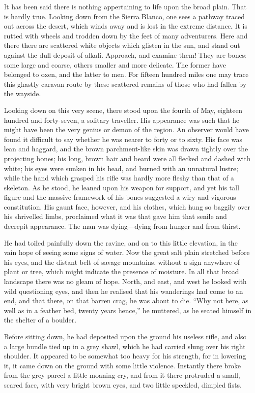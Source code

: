 \documentclass[12pt]{book}
\begin{document}
It has been said there is nothing appertaining to life upon the broad plain. That is hardly true. Looking down from the Sierra Blanco, one sees a pathway traced out across the desert, which winds away and is lost in the extreme distance. It is rutted with wheels and trodden down by the feet of many adventurers. Here and there there are scattered white objects which glisten in the sun, and stand out against the dull deposit of alkali. Approach, and examine them! They are bones: some large and coarse, others smaller and more delicate. The former have belonged to oxen, and the latter to men. For fifteen hundred miles one may trace this ghastly caravan route by these scattered remains of those who had fallen by the wayside. 

Looking down on this very scene, there stood upon the fourth of May, eighteen hundred and forty-seven, a solitary traveller. His appearance was such that he might have been the very genius or demon of the region. An observer would have found it difficult to say whether he was nearer to forty or to sixty. His face was lean and haggard, and the brown parchment-like skin was drawn tightly over the projecting bones; his long, brown hair and beard were all flecked and dashed with white; his eyes were sunken in his head, and burned with an unnatural lustre; while the hand which grasped his rifle was hardly more fleshy than that of a skeleton. As he stood, he leaned upon his weapon for support, and yet his tall figure and the massive framework of his bones suggested a wiry and vigorous constitution. His gaunt face, however, and his clothes, which hung so baggily over his shrivelled limbs, proclaimed what it was that gave him that senile and decrepit appearance. The man was dying—dying from hunger and from thirst. 

He had toiled painfully down the ravine, and on to this little elevation, in the vain hope of seeing some signs of water. Now the great salt plain stretched before his eyes, and the distant belt of savage mountains, without a sign anywhere of plant or tree, which might indicate the presence of moisture. In all that broad landscape there was no gleam of hope. North, and east, and west he looked with wild questioning eyes, and then he realised that his wanderings had come to an end, and that there, on that barren crag, he was about to die. “Why not here, as well as in a feather bed, twenty years hence,” he muttered, as he seated himself in the shelter of a boulder. 

Before sitting down, he had deposited upon the ground his useless rifle, and also a large bundle tied up in a grey shawl, which he had carried slung over his right shoulder. It appeared to be somewhat too heavy for his strength, for in lowering it, it came down on the ground with some little violence. Instantly there broke from the grey parcel a little moaning cry, and from it there protruded a small, scared face, with very bright brown eyes, and two little speckled, dimpled fists. 
\end{document}
